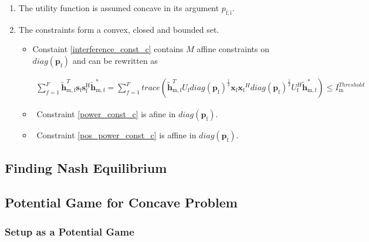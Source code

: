 \documentclass[12pt,a4paper]{report}
\begin{document}
\begin{enumerate}
\item The utility function is assumed concave in its argument $p_{\mathrm{f,i}}$.

\item
The constraints form a convex, closed and bounded set. 

\begin{itemize}

\item
	Constaint \eqref{interference_const_c} contains $M$ affine constraints on $diag(\mathbf{p_{\mathrm{f}}})$ and 
	can be rewritten as 

\begin{gather*}
	  \sum^F_{f=1} \mathbf{\tilde{h}}_{\mathrm{m,f}}^T  \mathbf{s}_{\mathrm{f}} 						
	\mathbf{s_{\mathrm{f}}^{\mathrm{H}}} \mathbf{\tilde{h}_{\mathrm{m,f}}^*} = 
	\sum^F_{f=1} trace(\mathbf{\tilde{h}}_{\mathrm{m,f}}^T U_{\mathrm{f}}diag(\mathbf{p_{\mathrm{f}}})^{\frac{1}{2}}\mathbf{x_{\mathrm{f}}}
	 \mathbf{x_{\mathrm{f}}}^H  diag(\mathbf{p_{\mathrm{f}}})^{\frac{1}{2}} U_{\mathrm{f}}^H
	 \mathbf{\tilde{h}}_{\mathrm{m,f}}^*
	)	
	\leq I^{Threshold}_{\mathrm{m}} 
\end{gather*}

\item \
	Constraint \eqref{power_const_c} is  afine in $diag(\mathbf{p_{\mathrm{f}}})$.
	
\item \
	Constraint \eqref{pos_power_const_c} is affine in $diag(\mathbf{p_{\mathrm{f}}})$.
\end{itemize}


\end{enumerate}



\subsection{Finding Nash Equilibrium}



\subsection{Potential Game for Concave Problem}

\subsubsection{Setup as a Potential Game}
\end{document}
